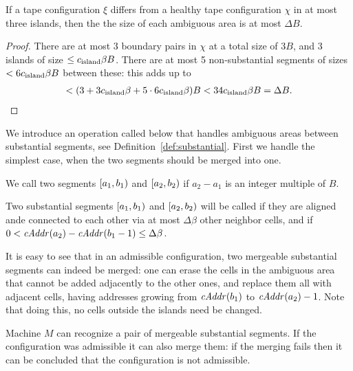 \documentclass[12pt]{memoir}
\renewcommand{\le}{\leq}
\newcommand{\fld}[1]{\ensuremath{\textit{#1\/}}}
\def\B{B}
\newcommand{\cAddr}{\fld{cAddr}}
\newcommand{\cns}[1]{c_{\textrm{\upshape #1}}}
\begin{document}
\begin{lemma}\label{lem:ambiguous}
If a tape configuration \( \xi \) differs from a  healthy tape 
configuration \( \chi \) in at most three islands, then the
the size of each ambiguous area is at most \( \Delta\B \).
\end{lemma}
\begin{proof}
There are at most 3 boundary pairs in \( \chi \) at a total size of \( 3\B \), and
3 islands of size \( \le\cns{island}\beta\B \).
There are at most 5 non-substantial segments of sizes \( < 6\cns{island}\beta\B \)
between these: this adds up to
\begin{align*}
 < (3+3\cns{island}\beta+ 5\cdot 6\cns{island}\beta)\B<34\cns{island}\beta\B=\Delta\B.
 \end{align*}
\end{proof}

We introduce an operation called  below that handles
ambiguous areas between substantial segments, see Definition~\ref{def:substantial}.
First we handle the simplest case, when the two segments should be
merged into one.

\begin{definition}
We call two segments \( \left[a_{1},b_{1}\right) \) and \( \left[a_{2},b_{2}\right) \)  
if \( a_{2}-a_{1} \) is an integer multiple of \( \B \).

Two substantial  segments \( \left[a_{1},b_{1}\right) \) and \( \left[a_{2},b_{2}\right) \) will be
called  if they are aligned ande connected to each other via at most
\( \Delta\beta \) other neighbor cells, and if \( 0<\cAddr(a_{2})-\cAddr(b_{1}-1)\le \Delta\beta \).  
\end{definition}

It is easy to see that in an admissible configuration, two mergeable substantial segments can indeed
be merged: one can erase the cells in the ambiguous area
that cannot be added adjacently to the other ones, and replace them all with adjacent cells,
having addresses growing from \( \cAddr(b_{1}) \) to \( \cAddr(a_{2})-1 \).
Note that doing this, no cells outside the islands need be changed.

Machine \( M \) can recognize a pair of mergeable substantial segments.
If the configuration was admissible it can also merge them: if the merging
fails then it can be concluded that the configuration is not admissible.
\end{document}
